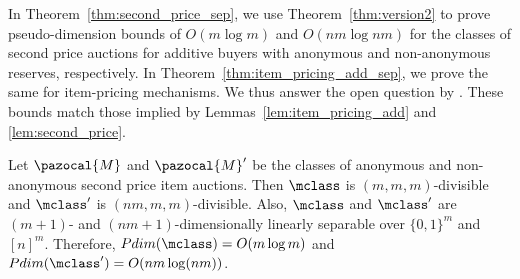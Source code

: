 In Theorem~\ref{thm:second_price_sep}, we use Theorem~\ref{thm:version2} to prove pseudo-dimension bounds of $O\left(m \log m\right)$ and $O\left(nm \log nm\right)$ for the classes of second price auctions for additive buyers with anonymous and non-anonymous reserves, respectively. In Theorem~\ref{thm:item_pricing_add_sep}, we prove the same for item-pricing mechanisms. We thus answer the open question by \citet{Morgenstern16:Learning}. These bounds match those implied by Lemmas~\ref{lem:item_pricing_add} and \ref{lem:second_price}.


\begin{theorem}\label{thm:second_price_sep}
Let $\pazocal{M}$ and $\pazocal{M}'$ be the classes of anonymous and non-anonymous second price item auctions. Then $\mclass$ is $\left(m, m, m\right)$-divisible and $\mclass'$ is $(nm, m, m)$-divisible. Also, $\mclass$ and $\mclass'$ are $(m+1)$- and $(nm+1)$-dimensionally linearly separable over $\{0,1\}^m$ and $[n]^m$. Therefore, $Pdim(\mclass) = O(m \log m)$ and $Pdim(\mclass') = O(nm \log (nm))$.
\end{theorem}


